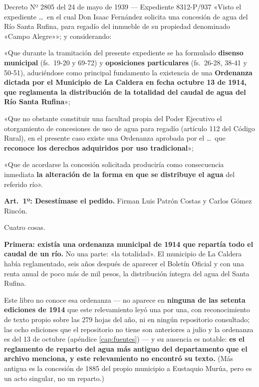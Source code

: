 \begin{ficha}{Decreto Nº 2805 del 24 de mayo de 1939 --- Expediente 8312-P/937}
«Visto el expediente \ldots\ en el cual Don Isaac Fernández solicita una concesión de agua del
Río Santa Rufina, para regadío del inmueble de su propiedad denominado «Campo Alegre»»; y
considerando:

«Que durante la tramitación del presente expediente se ha formulado \textbf{disenso municipal}
(fs.\ 19-20 y 69-72) y \textbf{oposiciones particulares} (fs.\ 26-28, 38-41 y 50-51),
aduciéndose como principal fundamento la existencia de una \textbf{Ordenanza dictada por el
Municipio de La Caldera en fecha octubre 13 de 1914, que reglamenta la distribución de la
totalidad del caudal de agua del Río Santa Rufina}»;

«Que no obstante constituir una facultad propia del Poder Ejecutivo el otorgamiento de
concesiones de uso de agua para regadío (artículo 112 del Código Rural), en el presente caso
existe una Ordenanza aprobada por el \ldots\ que \textbf{reconoce los derechos adquiridos por
uso tradicional}»;

«Que de acordarse la concesión solicitada produciría como consecuencia inmediata \textbf{la
alteración de la forma en que se distribuye el agua} del referido río».

\textbf{Art.\ 1º: Desestímase el pedido.} Firman Luis Patrón Costas y Carlos Gómez Rincón.
\end{ficha}

Cuatro cosas.

\textbf{Primera: existía una ordenanza municipal de 1914 que repartía todo el caudal de un
río.} No una parte: «la totalidad». El municipio de La Caldera había reglamentado, seis años
después de aparecer el Boletín Oficial y con una renta anual de poco más de mil pesos, la
distribución íntegra del agua del Santa Rufina.

Este libro no conoce esa ordenanza --- no aparece en \textbf{ninguna de las setenta
ediciones de 1914} que este relevamiento leyó una por una, con reconocimiento de texto propio
sobre las 279 hojas del año, ni en ningún repositorio consultado; las ocho ediciones que el
repositorio no tiene son anteriores a julio y la ordenanza es del 13 de octubre (apéndice
\ref{cap:fuentes}) ---
y su ausencia es notable: \textbf{es el reglamento de reparto del agua más antiguo del departamento
que el archivo menciona, y este relevamiento no encontró su texto.} (Más antigua es la
concesión de 1885 del propio municipio a Eustaquio Murúa, pero es un acto singular, no un
reparto.)

